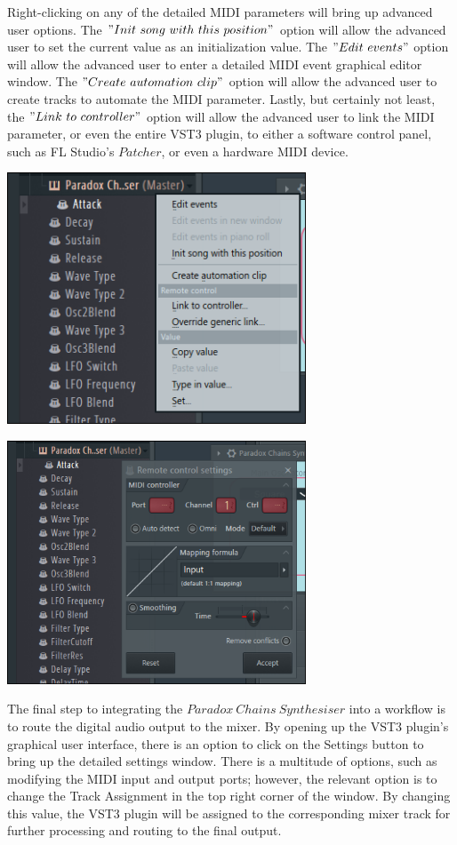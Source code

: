 \documentclass[a4paper,12pt]{report}
\begin{document}
Right-clicking on any of the detailed MIDI parameters will bring up advanced user options. The $"Init\ song\ with\ this\ position"$ option will allow the advanced user to set the current value as an initialization value. The $"Edit\ events"$ option will allow the advanced user to enter a detailed MIDI event graphical editor window. The $"Create\ automation\ clip"$ option will allow the advanced user to create tracks to automate the MIDI parameter. Lastly, but certainly not least, the $"Link\ to\ controller"$ option will allow the advanced user to link the MIDI parameter, or even the entire VST3 plugin, to either a software control panel, such as FL Studio's $Patcher$, or even a hardware MIDI device.

\begin{center}
\includegraphics[width=24em]{ExtraOptions01.png}
\end{center}

\begin{center}
\includegraphics[width=24em]{ExtraOptions02.png}
\end{center}

The final step to integrating the $Paradox\ Chains\ Synthesiser$ into a workflow is to route the digital audio output to the mixer. By opening up the VST3 plugin's graphical user interface, there is an option to click on the Settings button to bring up the detailed settings window. There is a multitude of options, such as modifying the MIDI input and output ports; however, the relevant option is to change the Track Assignment in the top right corner of the window. By changing this value, the VST3 plugin will be assigned to the corresponding mixer track for further processing and routing to the final output.
\end{document}
